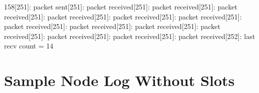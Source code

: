 \documentclass[parskip]{cs4rep}
\begin{document}
158[251]: packet sent[251]: packet received[251]: packet received[251]: packet received[251]: packet received[251]: packet received[251]: packet received[251]: packet received[251]: packet received[251]: packet received[251]: packet received[251]: packet received[251]: packet received[251]: packet received[252]: last recv count = 14\newline

\chapter{Sample Node Log Without Slots}
\end{document}
